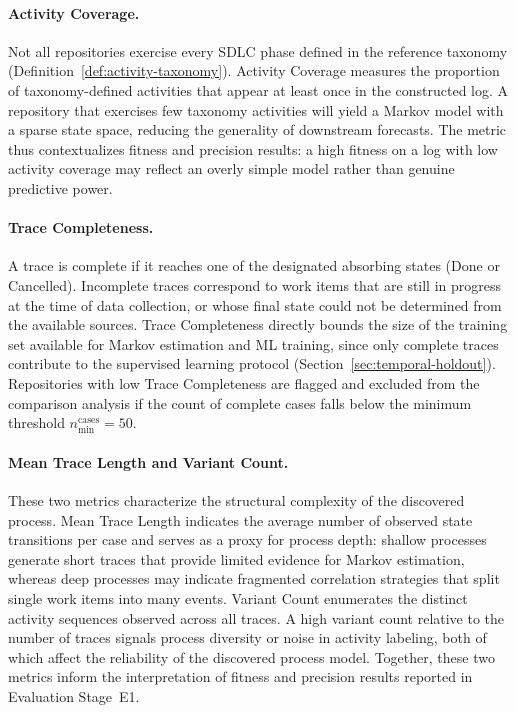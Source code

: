 \paragraph{Activity Coverage.}
Not all repositories exercise every SDLC phase defined in the reference
taxonomy (Definition~\ref{def:activity-taxonomy}).
Activity Coverage measures the proportion of taxonomy-defined activities
that appear at least once in the constructed log.
A repository that exercises few taxonomy activities will yield a
Markov model with a sparse state space, reducing the generality of
downstream forecasts.
The metric thus contextualizes fitness and precision results: a high
fitness on a log with low activity coverage may reflect an overly
simple model rather than genuine predictive power.
 
\paragraph{Trace Completeness.}
A trace is complete if it reaches one of the designated absorbing
states (Done or Cancelled).
Incomplete traces correspond to work items that are still in progress
at the time of data collection, or whose final state could not be
determined from the available sources.
Trace Completeness directly bounds the size of the training set
available for Markov estimation and ML training, since only complete
traces contribute to the supervised learning protocol
(Section~\ref{sec:temporal-holdout}).
Repositories with low Trace Completeness are flagged and excluded
from the comparison analysis if the count of complete cases falls
below the minimum threshold $n_{\min}^{\text{cases}} = 50$.
 
\paragraph{Mean Trace Length and Variant Count.}
These two metrics characterize the structural complexity of the
discovered process.
Mean Trace Length indicates the average number of observed state
transitions per case and serves as a proxy for process depth: shallow
processes generate short traces that provide limited evidence for
Markov estimation, whereas deep processes may indicate fragmented
correlation strategies that split single work items into many events.
Variant Count enumerates the distinct activity sequences observed
across all traces.
A high variant count relative to the number of traces signals process
diversity or noise in activity labeling, both of which affect the
reliability of the discovered process model.
Together, these two metrics inform the interpretation of fitness and
precision results reported in Evaluation Stage~E1.
 
